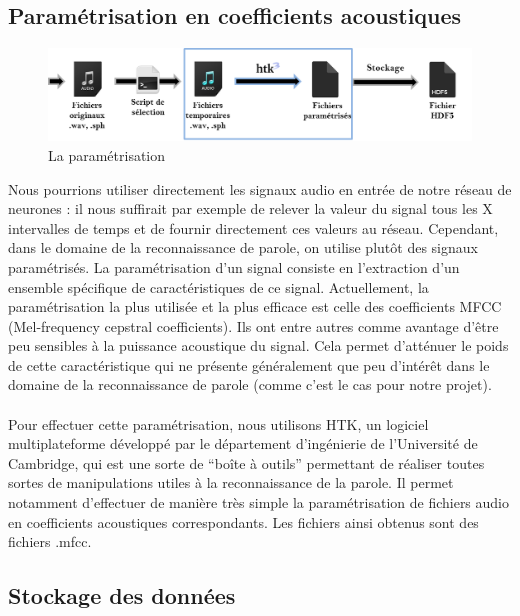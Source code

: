 \documentclass{article}
\begin{document}
\subsection{Paramétrisation en coefficients acoustiques}

\hphantom{.}
\begin{figure}[h]
  \centerline{\includegraphics[scale=0.8]{img/schema_parametrisation.png}}
  \caption{La paramétrisation}
\end{figure}

Nous pourrions utiliser directement les signaux audio en entrée de notre réseau de neurones : il nous suffirait par exemple de relever la valeur du signal tous les X intervalles de temps et de fournir directement ces valeurs au réseau. Cependant, dans le domaine de la reconnaissance de parole, on utilise plutôt des signaux paramétrisés.
La paramétrisation d'un signal consiste en l'extraction d'un ensemble spécifique de caractéristiques de ce signal. Actuellement, la paramétrisation la plus utilisée et la plus efficace est celle des coefficients MFCC\cite{haton2006} (Mel-frequency cepstral coefficients). Ils ont entre autres comme avantage d'être peu sensibles à la puissance acoustique du signal. Cela permet d'atténuer le poids de cette caractéristique qui ne présente généralement que peu d'intérêt dans le domaine de la reconnaissance de parole (comme c'est le cas pour notre projet).\\
\\
Pour effectuer cette paramétrisation, nous utilisons HTK\cite{docHTK}, un logiciel multiplateforme développé par le département d'ingénierie de l'Université de Cambridge, qui est une sorte de ``boîte à outils'' permettant de réaliser toutes sortes de manipulations utiles à la reconnaissance de la parole. Il permet notamment d'effectuer de manière très simple la paramétrisation de fichiers audio en coefficients acoustiques correspondants. Les fichiers ainsi obtenus sont des fichiers .mfcc.
 
\subsection{Stockage des données}
\end{document}
